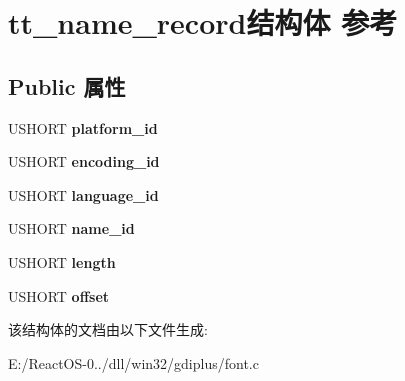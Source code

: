 \hypertarget{structtt__name__record}{}\section{tt\+\_\+name\+\_\+record结构体 参考}
\label{structtt__name__record}
\subsection*{Public 属性}
\begin{DoxyCompactItemize}
\item 
\mbox{\label{structtt__name__record_aca84d62e68954f519ecf02f82ba2c6c3}} 
U\+S\+H\+O\+RT {\bfseries platform\+\_\+id}
\item 
\mbox{\label{structtt__name__record_a41e671b30618473aac669f285eaa3cfa}} 
U\+S\+H\+O\+RT {\bfseries encoding\+\_\+id}
\item 
\mbox{\label{structtt__name__record_a93f1d53a41ae9f57bde425426bc54ef6}} 
U\+S\+H\+O\+RT {\bfseries language\+\_\+id}
\item 
\mbox{\label{structtt__name__record_ae7af74c3001e20c2595bfcca104f6f4a}} 
U\+S\+H\+O\+RT {\bfseries name\+\_\+id}
\item 
\mbox{\label{structtt__name__record_a92cb6aa5475f97b857da9cc0a67fa5f5}} 
U\+S\+H\+O\+RT {\bfseries length}
\item 
\mbox{\label{structtt__name__record_a0a8bce68f49ba0970e65e51ad2b5376b}} 
U\+S\+H\+O\+RT {\bfseries offset}
\end{DoxyCompactItemize}


该结构体的文档由以下文件生成\+:\begin{DoxyCompactItemize}
\item 
E\+:/\+React\+O\+S-\/0../dll/win32/gdiplus/font.\+c\end{DoxyCompactItemize}
